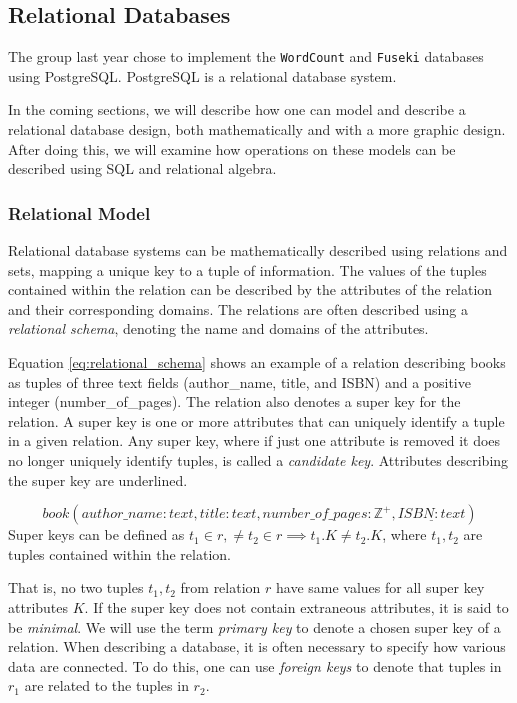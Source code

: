 \subsection{Relational Databases}\label{relational_databases}
The group last year chose to implement the \texttt{WordCount} and \texttt{Fuseki} databases using PostgreSQL.
PostgreSQL is a relational database system\cite{knox2020}.

In the coming sections, we will describe how one can model and describe a relational database design, both mathematically and with a more graphic design.
After doing this, we will examine how operations on these models can be described using SQL and relational algebra.

\subsubsection*{Relational Model}
Relational database systems can be mathematically described using relations and sets, mapping a unique key to a tuple of information\cite{DBSBook}.
The values of the tuples contained within the relation can be described by the attributes of the relation and their corresponding domains\cite{KatjaFirstPP}. 
The relations are often described using a \textit{relational schema}, denoting the name and domains of the attributes.


Equation \ref{eq:relational_schema} shows an example of a relation describing books as tuples of three text fields (author\_name, title, and ISBN) and a positive integer (number\_of\_pages).
The relation also denotes a super key for the relation. A super key is one or more attributes that can uniquely identify a tuple in a given relation.
Any super key, where if just one attribute is removed it does no longer uniquely identify tuples, is called a \textit{candidate key}.
Attributes describing the super key are underlined.

\begin{equation} \label{eq:relational_schema}
    book(author\_name:text, title: text, number\_of\_pages:\mathbb{Z}^+, \underline{ISBN: text})
\end{equation}
Super keys can be defined as $t_1 \in r,\neq t_2 \in r \implies t_1.K \neq t_2.K$, where $t_1, t_2$ are tuples contained within the relation.

That is, no two tuples $t_1, t_2$ from relation $r$ have same values for all super key attributes $K$. 
If the super key does not contain extraneous attributes, it is said to be \textit{minimal}. \cite{DBSBook}
We will use the term \textit{primary key} to denote a chosen super key of a relation. 
When describing a database, it is often necessary to specify how various data are connected. 
To do this, one can use \textit{foreign keys} to denote that tuples in $r_1$ are related to the tuples in $r_2$.


